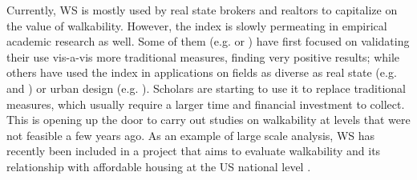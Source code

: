 \documentclass[12pt]{article}
\begin{document}
Currently, WS is mostly used by real state brokers and realtors to capitalize
on the value of walkability. However, the index is slowly permeating in
empirical academic research as well.
Some of them (e.g. \citealp{duncanWS2011} or \citealp{car2010ws}) have first focused on
validating their use vis-a-vis more traditional measures, finding very positive results;
while others have used the index in applications on fields as diverse as real
state (e.g. \citealp{locationmortgage2010JORSE} and \citealp{pivo2011ws})
or urban design (e.g. \citealp{emilyjulia2013}).
%
Scholars are starting to use it to
replace traditional measures, which usually require a larger time and
financial investment to collect. This is opening up the door to carry out
studies on walkability at levels that were not feasible a few years ago.
%
As an example of large scale analysis, WS has recently been included in
a project that aims to evaluate walkability and its relationship with
affordable housing at the US national level \citep{kochinskyTalen2012hud}.
\end{document}
